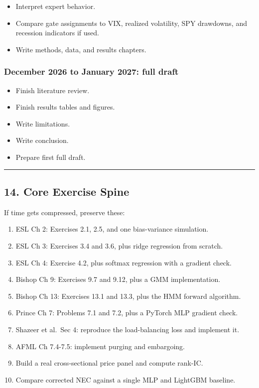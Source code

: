 \begin{itemize}
\tightlist
\item
  Interpret expert behavior.
\item
  Compare gate assignments to VIX, realized volatility, SPY drawdowns,
  and recession indicators if used.
\item
  Write methods, data, and results chapters.
\end{itemize}

\subsubsection{December 2026 to January 2027: full
draft}\label{december-2026-to-january-2027-full-draft}

\begin{itemize}
\tightlist
\item
  Finish literature review.
\item
  Finish results tables and figures.
\item
  Write limitations.
\item
  Write conclusion.
\item
  Prepare first full draft.
\end{itemize}

\begin{center}\rule{0.5\linewidth}{0.5pt}\end{center}

\subsection{14. Core Exercise Spine}\label{core-exercise-spine}

If time gets compressed, preserve these:

\begin{enumerate}
\def\labelenumi{\arabic{enumi}.}
\tightlist
\item
  ESL Ch 2: Exercises 2.1, 2.5, and one bias-variance simulation.
\item
  ESL Ch 3: Exercises 3.4 and 3.6, plus ridge regression from scratch.
\item
  ESL Ch 4: Exercise 4.2, plus softmax regression with a gradient check.
\item
  Bishop Ch 9: Exercises 9.7 and 9.12, plus a GMM implementation.
\item
  Bishop Ch 13: Exercises 13.1 and 13.3, plus the HMM forward algorithm.
\item
  Prince Ch 7: Problems 7.1 and 7.2, plus a PyTorch MLP gradient check.
\item
  Shazeer et al.~Sec 4: reproduce the load-balancing loss and implement
  it.
\item
  AFML Ch 7.4-7.5: implement purging and embargoing.
\item
  Build a real cross-sectional price panel and compute rank-IC.
\item
  Compare corrected NEC against a single MLP and LightGBM baseline.
\end{enumerate}

